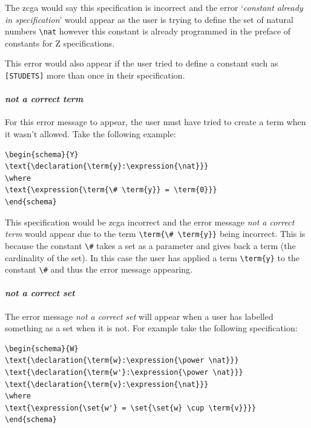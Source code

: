 The \gls{zcga} would say this specification is incorrect and the error
`\emph{constant already in specification}' would appear as the user is trying to
define the set of natural numbers \verb|\nat| however this constant is already
programmed in the preface of constants for Z specifications.

This error would also appear if the user tried to define a constant such as
\verb|[STUDETS]| more  than once in their specification.

\paragraph{\emph{not a correct term}}

For this error message to appear, the user must have tried to create a term when
it wasn't allowed. Take the following example:

\begin{exam}
\begin{verbatim}       
\begin{schema}{Y}
\text{\declaration{\term{y}:\expression{\nat}}}
\where
\text{\expression{\term{\# \term{y}} = \term{0}}}
\end{schema}
\end{verbatim}
\end{exam}

This specification would be \gls{zcga} incorrect and the error message \emph{not
a correct term} would appear due to the term \verb|\term{\# \term{y}}| being
incorrect. This is because the constant \verb|\#| takes a set as a parameter and
gives back a term (the cardinality of the set). In this case the user has
applied a term \verb|\term{y}| to the constant \verb|\#| and thus the error
message appearing.

\paragraph{\emph{not a correct set}}

The error message \emph{not a correct set} will appear when a user has labelled
something as a set when it is not. For example take the following specification:

\begin{exam}
\begin{verbatim}       
\begin{schema}{W}
\text{\declaration{\term{w}:\expression{\power \nat}}}
\text{\declaration{\term{w'}:\expression{\power \nat}}}
\text{\declaration{\term{v}:\expression{\nat}}}
\where
\text{\expression{\set{w'} = \set{\set{w} \cup \term{v}}}}
\end{schema}
\end{verbatim}
\end{exam}

